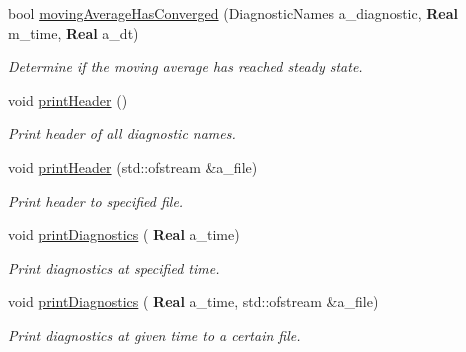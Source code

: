 \begin{DoxyCompactItemize}
\mbox{\label{class_diagnostics_a327e985849ad79673bfabbe10cada05b}} 
bool \hyperlink{class_diagnostics_a327e985849ad79673bfabbe10cada05b}{moving\+Average\+Has\+Converged} (Diagnostic\+Names a\+\_\+diagnostic, \textbf{ Real} m\+\_\+time, \textbf{ Real} a\+\_\+dt)
\begin{DoxyCompactList}\small\item\em Determine if the moving average has reached steady state. \end{DoxyCompactList}\item 
\mbox{\label{class_diagnostics_a2868f16188ebe067533afd6c0a27ff6a}} 
void \hyperlink{class_diagnostics_a2868f16188ebe067533afd6c0a27ff6a}{print\+Header} ()
\begin{DoxyCompactList}\small\item\em Print header of all diagnostic names. \end{DoxyCompactList}\item 
\mbox{\label{class_diagnostics_a69849023434b32047f39b51e0630f568}} 
void \hyperlink{class_diagnostics_a69849023434b32047f39b51e0630f568}{print\+Header} (std\+::ofstream \&a\+\_\+file)
\begin{DoxyCompactList}\small\item\em Print header to specified file. \end{DoxyCompactList}\item 
\mbox{\label{class_diagnostics_acd87da429ff720d80cbb2e82431fadb7}} 
void \hyperlink{class_diagnostics_acd87da429ff720d80cbb2e82431fadb7}{print\+Diagnostics} (\textbf{ Real} a\+\_\+time)
\begin{DoxyCompactList}\small\item\em Print diagnostics at specified time. \end{DoxyCompactList}\item 
\mbox{\label{class_diagnostics_a510534ea0fa2b5e49f9f0aec1d7f8693}} 
void \hyperlink{class_diagnostics_a510534ea0fa2b5e49f9f0aec1d7f8693}{print\+Diagnostics} (\textbf{ Real} a\+\_\+time, std\+::ofstream \&a\+\_\+file)
\begin{DoxyCompactList}\small\item\em Print diagnostics at given time to a certain file. \end{DoxyCompactList}\item 

\end{DoxyCompactItemize}
